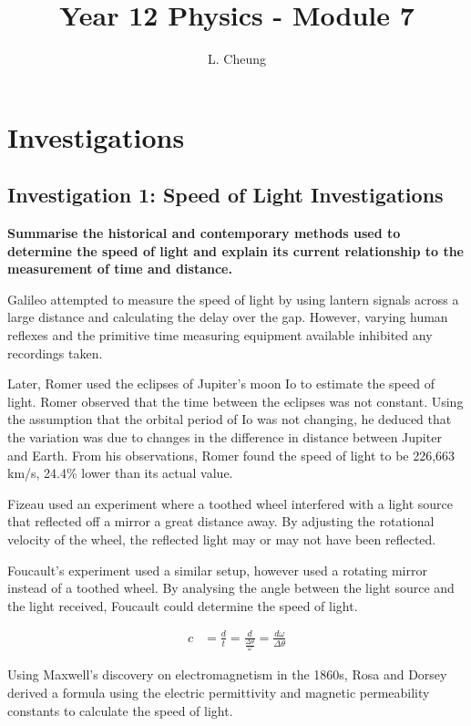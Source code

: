 \documentclass{report}
\title{\Huge Year 12 Physics - Module 7}
\author{L. Cheung}
\begin{document}
	\maketitle
	\tableofcontents
\newpage

\chapter{Investigations}

	\section{Investigation 1: Speed of Light Investigations}
	
		\textbf{Summarise the historical and contemporary methods used to determine the speed of light and explain its current relationship to the measurement of time and distance.}

			Galileo attempted to measure the speed of light by using lantern signals across a large distance and calculating the delay over the gap. However, varying human reflexes and the primitive time measuring equipment available inhibited any recordings taken.

			Later, Romer used the eclipses of Jupiter's moon Io to estimate the speed of light. Romer observed that the time between the eclipses was not constant. Using the assumption that the orbital period of Io was not changing, he deduced that the variation was due to changes in the difference in distance between Jupiter and Earth. From his observations, Romer found the speed of light to be 226,663 km/s, 24.4\% lower than its actual value.

			Fizeau used an experiment where a toothed wheel interfered with a light source that reflected off a mirror a great distance away. By adjusting the rotational velocity of the wheel, the reflected light may or may not have been reflected.

			Foucault's experiment used a similar setup, however used a rotating mirror instead of a toothed wheel. By analysing the angle between the light source and the light received, Foucault could determine the speed of light.

			\begin{align*}
				c &= \frac{d}{t} = \frac{d}{\frac{\Delta \theta}{\omega}} = \frac{d \omega}{\Delta \theta}
			\end{align*}

			Using Maxwell's discovery on electromagnetism in the 1860s, Rosa and Dorsey derived a formula using the electric permittivity and magnetic permeability constants to calculate the speed of light.
\end{document}
